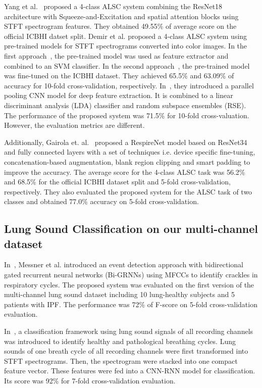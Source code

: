 \documentclass[journal]{IEEEtran}
\begin{document}
Yang et al.~\cite{yang2020adventitious} proposed a 4-class ALSC system combining the ResNet18 architecture with Squeeze-and-Excitation and spatial attention blocks using STFT spectrogram features. They obtained 49.55\% of average score on the official ICBHI datset split. 
Demir et al. proposed a 4-class ALSC system using pre-trained models for STFT spectrograms converted into color images. In the first approach~\cite{demir2020convolutional}, the pre-trained model was used as feature extractor and combined to an SVM classifier. In the second approach~\cite{demir2020convolutional}, the pre-trained model was fine-tuned on the ICBHI dataset. They achieved 65.5\% and 63.09\% of accuracy for 10-fold cross-validation, respectively. In~\cite{demir2020classification}, they introduced a parallel pooling CNN model for deep feature extraction. It is combined to a linear discriminant analysis (LDA) classifier and random subspace ensembles (RSE). The performance of the proposed system was 71.5\% for 10-fold cross-valuation. However, the evaluation metrics are different. 

Additionally, Gairola et. al.~\cite{gairola2020respirenet} proposed a RespireNet model based on ResNet34 and fully connected layers with a set of techniques i.e. device specific fine-tuning, concatenation-based augmentation, blank region clipping and smart padding to improve the accuracy. The average score for the 4-class ALSC task was 56.2\% and 68.5\% for the official ICBHI dataset split and 5-fold cross-validation, respectively. They also evaluated the proposed system for the ALSC task of two classes and obtained 77.0\% accuracy on 5-fold cross-validation. 

\subsection{Lung Sound Classification on our multi-channel dataset}
In~\cite{messner2018crackle}, Messner et al. introduced an event detection approach with bidirectional gated recurrent neural networks (Bi-GRNNs) using MFCCs to identify crackles in respiratory cycles. The proposed system was evaluated on the first version of the multi-channel lung sound dataset including  10 lung-healthy subjects and 5 patients with IPF. The performance was 72\% of F-score on 5-fold cross-validation evaluation.

In~\cite{messner2020multi}, a classification framework using lung sound signals of all recording channels was introduced to identify healthy and pathological breathing cycles. Lung sounds of one breath cycle of all recording channels were first transformed into STFT spectrograms. Then, the spectrogram were stacked into one compact feature vector. These features were fed into a CNN-RNN model for classification. Its score was 92\% for 7-fold cross-validation evaluation.
\end{document}

